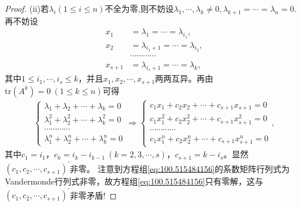 \documentclass[../../main.tex]{subfiles}
\begin{document}
\begin{proof}
(ii)若$\lambda_i(1\leqslant  i\leqslant  n)$不全为零,则不妨设$\lambda_1,\cdots,\lambda_k\ne 0,\lambda_{k+1}=\cdots=\lambda_n=0$.再不妨设
\begin{align*}
x_1&=\lambda _1=\cdots =\lambda _{i_1},\\
x_2&=\lambda _{i_1+1}=\cdots =\lambda _{i_2},\\
&\cdots \cdots \cdots \cdots \\
x_{s + 1}&=\lambda _{i_s+1}=\cdots =\lambda _k,
\end{align*}
其中$1\leqslant  i_1,\cdots,i_s\leqslant  k$，并且$x_1,x_2,\cdots,x_{s + 1}$两两互异。再由$\mathrm{tr}(A^k)=0\ (1\leqslant  k\leqslant  n)$可得
\begin{align}
\begin{cases}
\lambda _1+\lambda _2+\cdots +\lambda _k=0\\
\lambda _{1}^{2}+\lambda _{2}^{2}+\cdots +\lambda _{k}^{2}=0\\
\cdots \cdots \cdots \cdots\\
\lambda _{1}^{n}+\lambda _{2}^{n}+\cdots +\lambda _{k}^{n}=0
\end{cases}\Rightarrow 
\begin{cases}
c_1x_1+c_2x_2+\cdots +c_{s + 1}x_{s + 1}=0\\
c_1x_{1}^{2}+c_2x_{2}^{2}+\cdots +c_{s + 1}x_{s + 1}^{2}=0\\
\cdots \cdots \cdots \cdots\\
c_1x_{1}^{n}+c_2x_{2}^{n}+\cdots +c_{s + 1}x_{s + 1}^{n}=0
\end{cases}, \label{eq:100.515484156}
\end{align}
其中$c_1 = i_1$，$c_k = i_k - i_{k - 1}\ (k = 2,3,\cdots,s)$，$c_{s + 1} = k - i_s$。显然$(c_1,c_2,\cdots,c_{s + 1})^\prime$非零。
注意到方程组\eqref{eq:100.515484156}的系数矩阵行列式为Vandermonde行列式非零，故方程组\eqref{eq:100.515484156}只有零解，这与$(c_1,c_2,\cdots,c_{s + 1})^\prime$非零矛盾! 
\end{proof}
\end{document}
